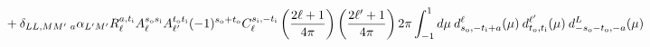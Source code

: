 \documentclass{article}
\newcommand{\si}[0]{{s_{\rm i}}}
\newcommand{\ti}[0]{{t_{\rm i}}}
\newcommand{\so}[0]{{s_{\rm o}}}
\renewcommand{\to}[0]{{t_{\rm o}}}
\begin{document}
\begin{equation}
\begin{split}
	&+\delta_{LL,MM'}\:_a\alpha_{L'M'} R^{a, \ti}_{\ell}  A^{\so \si}_\ell  A^{\to \ti}_{\ell'} (-1)^{\so + \to}C_\ell^{\si,-\ti}\left(\frac{2\ell + 1}{4\pi} \right)\left(\frac{2\ell' + 1}{4\pi} \right) 2\pi \int_{-1}^{1} d\mu \:d_{\so,-\ti + a}^\ell (\mu)\: d_{\to,\ti}^{\ell'} (\mu)\:d_{-\so -\to,-a}^L(\mu)  \\
	\end{split}
\end{equation}
\end{document}
